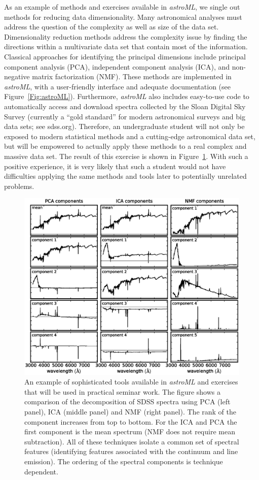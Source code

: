 As an example of methods and exercises available in  {\it astroML}, we single out methods 
for reducing data dimensionality. Many astronomical analyses must address the question of the 
complexity as well as size of the data set. Dimensionality reduction methods address the
complexity issue  by finding the directions within a multivariate data set that contain most 
of the information. Classical approaches for identifying the principal dimensions include
principal component analysis (PCA), independent component analysis (ICA), and non-negative 
matrix factorization (NMF). These methods are implemented in   {\it astroML}, with a user-friendly 
interface and adequate documentation (see Figure~\ref{Fig:astroML}). Furthermore, {\it astroML} also 
includes easy-to-use code to automatically access and download spectra collected by the Sloan Digital 
Sky Survey (currently a ``gold standard'' for modern astronomical surveys and big data sets; see sdss.org). 
Therefore, an undergraduate student will not only be exposed to modern statistical methods
and a cutting-edge astronomical data set, but will be empowered to actually apply these methods 
to a real complex and massive data set.  The result of this exercise is shown in Figure~\ref{Fig:astroML2}. 
With such a positive experience, it is very likely that such a student would not have difficulties applying 
the same methods and tools later to potentially unrelated problems.  


\begin{figure}[!t]
\vskip -1.8in
\includegraphics[width=1.02\hsize,clip]{astroML2.eps}
\vskip -2.0in
\caption{An example of sophisticated tools available in {\it astroML} and exercises that will be
used in practical seminar work. The figure shows a comparison of the decomposition of SDSS 
spectra using PCA (left panel), ICA (middle panel) and NMF (right panel). The rank of the component
increases from top to bottom. For the ICA and PCA the first component is the mean spectrum (NMF 
does not require mean subtraction). All of these techniques isolate a common set of spectral features 
(identifying features associated with the continuum and line emission). The ordering of the spectral 
components is technique dependent.} 
\label{Fig:astroML2}
\end{figure}







